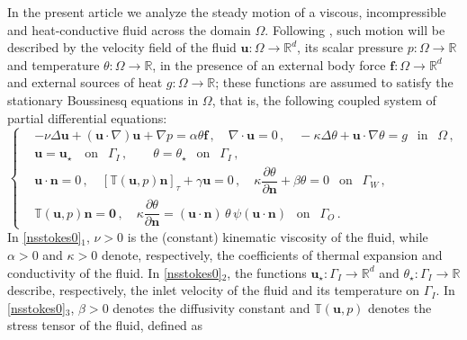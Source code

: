 \documentclass[10pt,a4paper]{article}
\begin{document}
In the present article we analyze the steady motion of a viscous, incompressible and heat-conductive fluid across the domain $\Omega$. Following \cite{acevedo2016boussinesq,acevedo2019p,arndt2020existence,ceretani2019boussinesq,kravcmarnon}, such motion will be described by the velocity field of the fluid $\boldsymbol{u} : \Omega \longrightarrow \mathbb{R}^d$, its scalar pressure $p : \Omega \longrightarrow \mathbb{R}$ and temperature $\theta : \Omega \longrightarrow \mathbb{R}$, in the presence of an external body force $\boldsymbol{f} : \Omega \longrightarrow \mathbb{R}^d$ and external sources of heat $g : \Omega \longrightarrow \mathbb{R}$; these functions are assumed to satisfy the stationary Boussinesq equations in $\Omega$, that is, the following coupled system of partial differential equations:
\begin{equation}\label{nsstokes0}
\left\{
\begin{aligned}
& -\nu\Delta \boldsymbol{u}+(\boldsymbol{u}\cdot\nabla)\boldsymbol{u}+\nabla p= \alpha \theta \boldsymbol{f} \, , \quad  \nabla\cdot \boldsymbol{u}=0 \, , \quad -\kappa \Delta \theta +  \boldsymbol{u} \cdot \nabla \theta =g \ \ \mbox{ in } \ \ \Omega \,, \\[3pt]
& \boldsymbol{u}= \boldsymbol{u}_{\star} \ \ \ \mbox{ on } \ \ \Gamma_{I} \,, \qquad \theta = \theta_{\star} \ \ \mbox{ on } \ \ \Gamma_{I} \, , \\[3pt]
& \boldsymbol{u} \cdot \boldsymbol{n} =0 \,, \quad \left[ \mathbb{T}(\boldsymbol{u},p) \boldsymbol{n} \right]_{\tau} + \gamma \boldsymbol{u} = 0 \,, \quad \kappa \dfrac{\partial \theta}{\partial \boldsymbol{n}} + \beta \theta = 0  \ \ \mbox{ on } \ \ \Gamma_{W} \,,   \\[3pt]
& \mathbb{T}(\boldsymbol{u},p) \boldsymbol{n} = \boldsymbol{0} \,, \quad \kappa \dfrac{\partial \theta}{\partial \boldsymbol{n}} = (\boldsymbol{u} \cdot \boldsymbol{n}) \, \theta \, \psi(\boldsymbol{u} \cdot \boldsymbol{n}) \ \ \mbox{ on } \ \ \Gamma_{O} \,.
\end{aligned}
\right.
\end{equation}
\noindent
In \eqref{nsstokes0}$_1$, $\nu>0$ is the (constant) kinematic viscosity of the fluid, while $\alpha > 0$ and $\kappa > 0$ denote, respectively, the coefficients of thermal expansion and conductivity of the fluid. In \eqref{nsstokes0}$_2$, the functions $\boldsymbol{u}_{\star} : \Gamma_{I} \longrightarrow \mathbb{R}^d$ and $\theta_{\star} : \Gamma_{I} \longrightarrow \mathbb{R}$ describe, respectively, the inlet velocity of the fluid and its temperature on $\Gamma_{I}$. In \eqref{nsstokes0}$_{3}$, $\beta > 0$ denotes the diffusivity constant and $\mathbb{T}(\boldsymbol{u},p)$ denotes the stress tensor of the fluid, defined as
\end{document}
